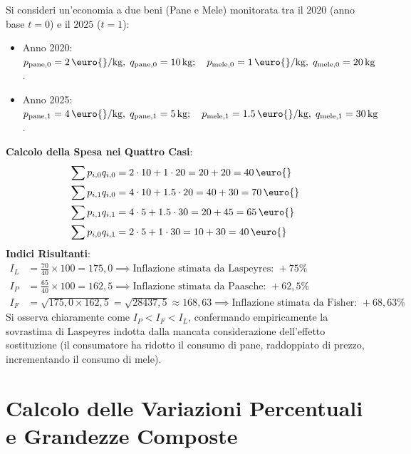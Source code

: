 \begin{esempio}
Si consideri un'economia a due beni (Pane e Mele) monitorata tra il $2020$ (anno base $t=0$) e il $2025$ ($t=1$):
\begin{itemize}
    \item Anno 2020: $p_{\text{pane},0} = 2\,\text{\euro{}/kg}, \; q_{\text{pane},0} = 10\,\text{kg}; \quad p_{\text{mele},0} = 1\,\text{\euro{}/kg}, \; q_{\text{mele},0} = 20\,\text{kg}$.
    \item Anno 2025: $p_{\text{pane},1} = 4\,\text{\euro{}/kg}, \; q_{\text{pane},1} = 5\,\text{kg}; \quad p_{\text{mele},1} = 1.5\,\text{\euro{}/kg}, \; q_{\text{mele},1} = 30\,\text{kg}$.
\end{itemize}
\textbf{Calcolo della Spesa nei Quattro Casi}:
\begin{align*}
    \sum p_{i,0} q_{i,0} &= 2 \cdot 10 + 1 \cdot 20 = 20 + 20 = 40\,\text{\euro{}} \\
    \sum p_{i,1} q_{i,0} &= 4 \cdot 10 + 1.5 \cdot 20 = 40 + 30 = 70\,\text{\euro{}} \\
    \sum p_{i,1} q_{i,1} &= 4 \cdot 5 + 1.5 \cdot 30 = 20 + 45 = 65\,\text{\euro{}} \\
    \sum p_{i,0} q_{i,1} &= 2 \cdot 5 + 1 \cdot 30 = 10 + 30 = 40\,\text{\euro{}}
\end{align*}
\textbf{Indici Risultanti}:
\begin{align*}
    I_L &= \frac{70}{40} \times 100 = 175{,}0 \implies \text{Inflazione stimata da Laspeyres: } +75\% \\
    I_P &= \frac{65}{40} \times 100 = 162{,}5 \implies \text{Inflazione stimata da Paasche: } +62{,}5\% \\
    I_F &= \sqrt{175{,}0 \times 162{,}5} = \sqrt{28437{,}5} \approx 168{,}63 \implies \text{Inflazione stimata da Fisher: } +68{,}63\%
\end{align*}
Si osserva chiaramente come $I_P < I_F < I_L$, confermando empiricamente la sovrastima di Laspeyres indotta dalla mancata considerazione dell'effetto sostituzione (il consumatore ha ridotto il consumo di pane, raddoppiato di prezzo, incrementando il consumo di mele).
\end{esempio}

\section{Calcolo delle Variazioni Percentuali e Grandezze Composte}

